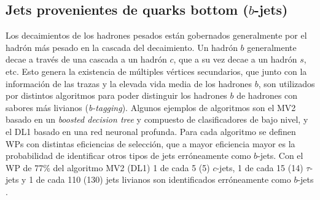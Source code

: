 \subsection{Jets provenientes de quarks bottom ($b$-jets)}

Los decaimientos de los hadrones pesados están gobernados generalmente por el hadrón más pesado en la cascada del decaimiento. Un hadrón $b$ generalmente decae a través de una cascada a un hadrón $c$, que a su vez decae a un hadrón $s$, etc. Esto genera la existencia de múltiples 
vértices secundarios, que junto con la información de las trazas y la elevada vida media de los hadrones $b$, son utilizados por distintos algoritmos para poder distinguir los hadrones $b$ de hadrones con sabores más livianos (\textit{b-tagging}). Algunos ejemplos de algoritmos \cite{btag} son el MV2 basado en un \textit{boosted decision tree} y compuesto de clasificadores de bajo nivel, y el DL1 basado en una red neuronal profunda. Para cada algoritmo se definen WPs con distintas eficiencias de selección, que a mayor eficiencia mayor es la probabilidad de identificar otros tipos de jets erróneamente como $b$-jets. Con el WP de 77\% del algoritmo MV2 (DL1) 1 de cada 5 (5) $c$-jets, 1 de cada 15 (14) $\tau$-jets y 1 de cada 110 (130) jets livianos son identificados erróneamente como $b$-jets \cite{btag}.



